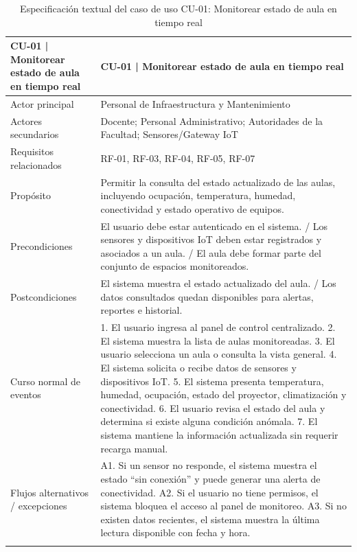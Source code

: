 \begingroup
\small
\begin{longtable}{|P{0.5000}|P{0.5000}|}
\hline
CU-01 | Monitorear estado de aula en tiempo real & CU-01 | Monitorear estado de aula en tiempo real \\ \hline
Actor principal & Personal de Infraestructura y Mantenimiento \\ \hline
Actores secundarios & Docente; Personal Administrativo; Autoridades de la Facultad; Sensores/Gateway IoT \\ \hline
Requisitos relacionados & RF-01, RF-03, RF-04, RF-05, RF-07 \\ \hline
Propósito & Permitir la consulta del estado actualizado de las aulas, incluyendo ocupación, temperatura, humedad, conectividad y estado operativo de equipos. \\ \hline
Precondiciones & El usuario debe estar autenticado en el sistema. / Los sensores y dispositivos IoT deben estar registrados y asociados a un aula. / El aula debe formar parte del conjunto de espacios monitoreados. \\ \hline
Postcondiciones & El sistema muestra el estado actualizado del aula. / Los datos consultados quedan disponibles para alertas, reportes e historial. \\ \hline
Curso normal de eventos & 1. El usuario ingresa al panel de control centralizado. 2. El sistema muestra la lista de aulas monitoreadas. 3. El usuario selecciona un aula o consulta la vista general. 4. El sistema solicita o recibe datos de sensores y dispositivos IoT. 5. El sistema presenta temperatura, humedad, ocupación, estado del proyector, climatización y conectividad. 6. El usuario revisa el estado del aula y determina si existe alguna condición anómala. 7. El sistema mantiene la información actualizada sin requerir recarga manual. \\ \hline
Flujos alternativos / excepciones & A1. Si un sensor no responde, el sistema muestra el estado ``sin conexión'' y puede generar una alerta de conectividad. A2. Si el usuario no tiene permisos, el sistema bloquea el acceso al panel de monitoreo. A3. Si no existen datos recientes, el sistema muestra la última lectura disponible con fecha y hora. \\ \hline
\caption{Especificación textual del caso de uso CU-01: Monitorear estado de aula en tiempo real}
\end{longtable}
\endgroup

